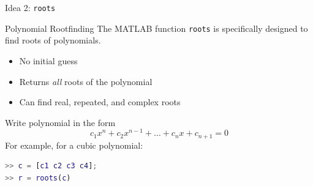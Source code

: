 \documentclass[10pt]{beamer}
\begin{document}

\begin{frame}[fragile]{Idea 2: \texttt{roots}}

\begin{block}{Polynomial Rootfinding}
The MATLAB function \texttt{roots} is specifically designed
to find roots of polynomials.
\end{block}

\begin{itemize}
    \item No initial guess
    \item Returns \emph{all} roots of the polynomial
    \item Can find real, repeated, and complex roots
\end{itemize}

\vspace{4ex}
Write polynomial in the form
\begin{equation*}
    c_1 x^n + c_2 x^{n-1} + \ldots + c_n x + c_{n+1} = 0
\end{equation*}
For example, for a cubic polynomial:
\begin{lstlisting}[language=matlab]
>> c = [c1 c2 c3 c4];
>> r = roots(c)
\end{lstlisting}
\end{frame}

\end{document}

